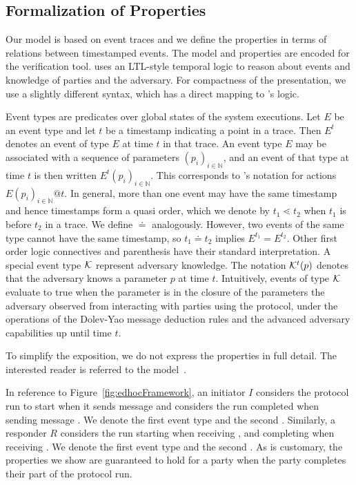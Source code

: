 \subsection{Formalization of Properties}
\label{sec:desired-properties}
Our model is based on event traces and we define the
properties in terms of relations between timestamped events.
%
The model and properties are encoded for the \mTamarin{} verification tool.
%
\mTamarin{} uses an LTL-style temporal logic to reason about events and
knowledge of parties and the adversary.
%
For compactness of the presentation, we use a slightly different syntax, which
has a direct mapping to \mTamarin{}'s logic.
%

Event types are predicates over global states of the system executions.
%
Let $E$ be an event type and let $t$ be a timestamp indicating a point in a
trace.
%
Then $E^{t}$ denotes an event of type $E$ at time $t$ in that trace.
%
An event type $E$ may be associated with a sequence of parameters
$(p_i)_{i\in\mathbb{N}}$, and an event of that type at time $t$ is then
written $E^t(p_i)_{i\in\mathbb{N}}$.
%
This corresponds to \mTamarin{}'s notation for actions
$E(p_i)_{i\in\mathbb{N}}@t$.
%
In general, more than one event may have the same timestamp and hence
timestamps form a quasi order, which we denote by $t_1 \lessdot t_2$ when $t_1$
is before $t_2$ in a trace.
%
We define $\doteq$ analogously.
%
However, two events of the same type cannot have the same timestamp, so
$t_1 \doteq t_2$ implies $E^{t_1} = E^{t_2}$.
%
Other first order logic connectives and parenthesis have their standard
interpretation.
%
A special event type $\mathcal{K}$ represent adversary knowledge.
%
The notation $\mathcal{K}^t(p)$ denotes that the adversary knows a parameter $p$ at
time $t$.
%
Intuitively, events of type $\mathcal{K}$ evaluate to true when the parameter is in
the closure of the
parameters the adversary observed from interacting with parties using the
protocol, under the operations of the Dolev-Yao message deduction rules and
the advanced adversary capabilities up until time $t$.
%

To simplify the exposition, we do not express the properties in full detail.
%
The interested reader is referred to the \mTamarin{}
model~\cite{edhocTamarinRepo}.
%

In reference to Figure~\ref{fig:edhocFramework}, an initiator $I$ considers the
protocol run to start when it sends message \mMsgone{} and considers the run
completed when sending message \mMsgthree{}.
%
We denote the first event type \mIStart{} and the second \mIComplete{}.
%
Similarly, a responder $R$ considers the run starting when receiving
\mMsgone{}, and completing when receiving \mMsgthree{}.
%
We denote the first event type \mRStart{} and the second \mRComplete{}.
%
As is customary, the properties we show are guaranteed to hold for a party when
the party completes their part of the protocol run.\\
%

